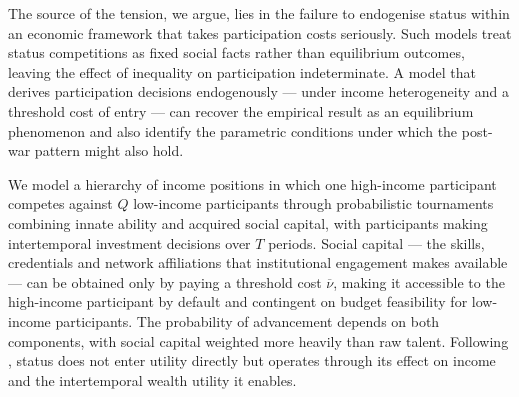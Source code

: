 \documentclass[
    oneside,
    fontsize=10pt,leqno]{article}
\begin{document}
The source of the tension, we argue, lies in the failure to endogenise
status within an economic framework that takes participation costs
seriously. Such models treat status competitions as fixed social facts
rather than equilibrium outcomes, leaving the effect of inequality on participation
indeterminate. A model that derives participation decisions endogenously
--- under income heterogeneity and a threshold cost of entry --- can
recover the empirical result as an equilibrium phenomenon and also identify
the parametric conditions under which the post-war pattern might also
hold.

We model a hierarchy of income positions in which one
high-income participant competes against $Q$ low-income participants through
probabilistic tournaments combining innate ability and acquired social
capital, with participants making intertemporal investment decisions
over $T$ periods. Social capital --- the skills, credentials and network
affiliations that institutional engagement makes available --- can
be obtained only by paying a threshold cost $\overline{\nu}$, making
it accessible to the high-income participant by default and contingent on
budget feasibility for low-income participants. The probability of advancement depends
on both components, with social capital weighted more heavily than
raw talent. Following
\citet{postlewaite1998socialbasisinterdeppreferences}, status does
not enter utility directly but operates through its effect on income
and the intertemporal wealth utility it enables.
\end{document}
